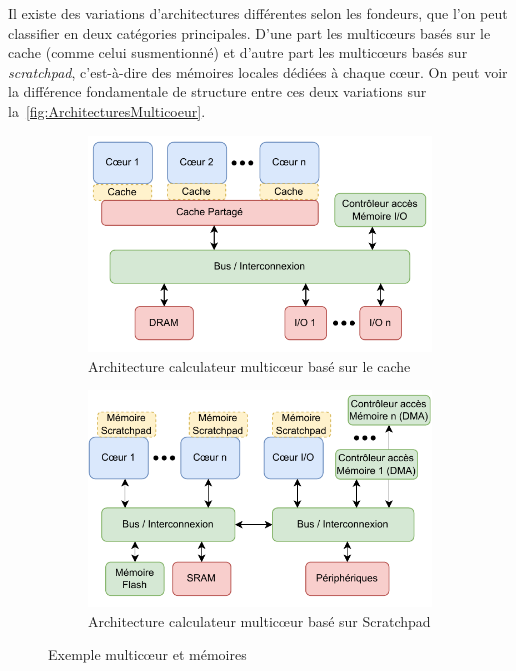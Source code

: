 \documentclass[french, a4paper, 11pt, twoside, pdftex]{StyleThese}
\begin{document}
			Il existe des variations d'architectures différentes selon les fondeurs, que l'on peut classifier en deux catégories principales. D'une part les multicœurs basés sur le cache (comme celui susmentionné) et d'autre part les multicœurs basés sur \emph{scratchpad}, c'est-à-dire des mémoires locales dédiées à chaque cœur. On peut voir la différence fondamentale de structure entre ces deux variations sur la~\autoref{fig:ArchitecturesMulticoeur}. 


\begin{figure}[h]
	\centering
	\begin{subfigure}{.45\textwidth} \centering
		\includegraphics[width=\linewidth]{schemas/Multicore-CacheBased}
		\caption[Diagramme Multicœur Cache]{Architecture calculateur multicœur basé sur le cache}
		\label{fig:multicoeurCache}
	\end{subfigure}
	\begin{subfigure}{.45\textwidth} \centering
		\includegraphics[width=\linewidth]{schemas/Multicore-ScratchpadBased}
		\caption[Diagramme Multicœur Scratchpad]{Architecture calculateur multicœur basé sur Scratchpad}
		\label{fig:multicœurScratchpad}
	\end{subfigure}
	\caption{Exemple multicœur et mémoires}
	\label{fig:ArchitecturesMulticoeur}
\end{figure}
\end{document}
